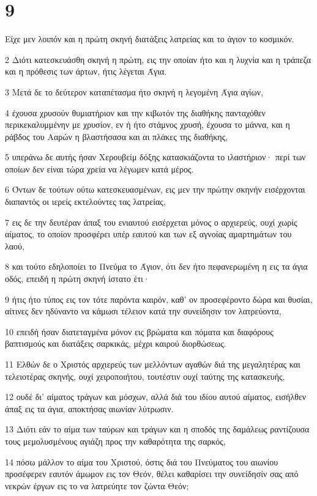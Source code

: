 \chapter{9}

\par Είχε μεν λοιπόν και η πρώτη σκηνή διατάξεις λατρείας και το άγιον το κοσμικόν.
\par 2 Διότι κατεσκευάσθη σκηνή η πρώτη, εις την οποίαν ήτο και η λυχνία και η τράπεζα και η πρόθεσις των άρτων, ήτις λέγεται Άγια.
\par 3 Μετά δε το δεύτερον καταπέτασμα ήτο σκηνή η λεγομένη Άγια αγίων,
\par 4 έχουσα χρυσούν θυμιατήριον και την κιβωτόν της διαθήκης πανταχόθεν περικεκαλυμμένην με χρυσίον, εν ή ήτο στάμνος χρυσή, έχουσα το μάννα, και η ράβδος του Ααρών η βλαστήσασα και αι πλάκες της διαθήκης,
\par 5 υπεράνω δε αυτής ήσαν Χερουβείμ δόξης κατασκιάζοντα το ιλαστήριον· περί των οποίων δεν είναι τώρα χρεία να λέγωμεν κατά μέρος.
\par 6 Όντων δε τούτων ούτω κατεσκευασμένων, εις μεν την πρώτην σκηνήν εισέρχονται διαπαντός οι ιερείς εκτελούντες τας λατρείας,
\par 7 εις δε την δευτέραν άπαξ του ενιαυτού εισέρχεται μόνος ο αρχιερεύς, ουχί χωρίς αίματος, το οποίον προσφέρει υπέρ εαυτού και των εξ αγνοίας αμαρτημάτων του λαού,
\par 8 και τούτο εδηλοποίει το Πνεύμα το Άγιον, ότι δεν ήτο πεφανερωμένη η εις τα άγια οδός, επειδή η πρώτη σκηνή ίστατο έτι·
\par 9 ήτις ήτο τύπος εις τον τότε παρόντα καιρόν, καθ' ον προσεφέροντο δώρα και θυσίαι, αίτινες δεν ηδύναντο να κάμωσι τέλειον κατά την συνείδησιν τον λατρεύοντα,
\par 10 επειδή ήσαν διατεταγμένα μόνον εις βρώματα και πόματα και διαφόρους βαπτισμούς και διατάξεις σαρκικάς, μέχρι καιρού διορθώσεως.
\par 11 Ελθών δε ο Χριστός αρχιερεύς των μελλόντων αγαθών διά της μεγαλητέρας και τελειοτέρας σκηνής, ουχί χειροποιήτου, τουτέστιν ουχί ταύτης της κατασκευής,
\par 12 ουδέ δι' αίματος τράγων και μόσχων, αλλά διά του ιδίου αυτού αίματος, εισήλθεν άπαξ εις τα άγια, αποκτήσας αιωνίαν λύτρωσιν.
\par 13 Διότι εάν το αίμα των ταύρων και τράγων και η σποδός της δαμάλεως ραντίζουσα τους μεμολυσμένους αγιάζη προς την καθαρότητα της σαρκός,
\par 14 πόσω μάλλον το αίμα του Χριστού, όστις διά του Πνεύματος του αιωνίου προσέφερεν εαυτόν άμωμον εις τον Θεόν, θέλει καθαρίσει την συνείδησίν σας από νεκρών έργων εις το να λατρεύητε τον ζώντα Θεόν;
